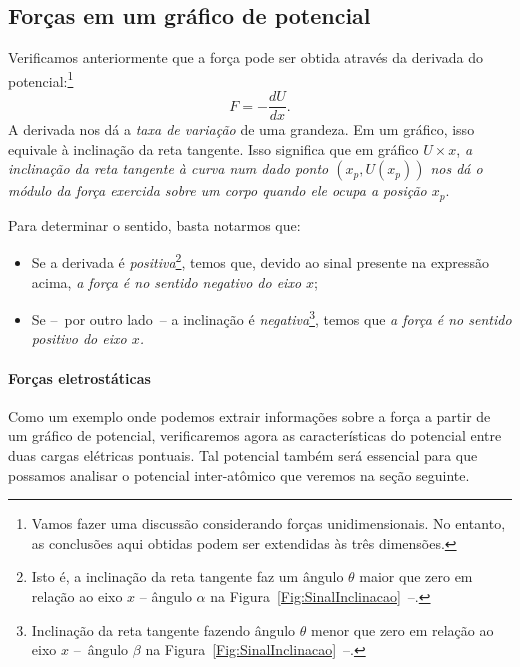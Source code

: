 \subsection{Forças em um gráfico de potencial}

Verificamos anteriormente que a força pode ser obtida através da derivada do potencial:\footnote{Vamos fazer uma discussão considerando forças unidimensionais. No entanto, as conclusões aqui obtidas podem ser extendidas às três dimensões.}
\begin{equation*}
    F = -\frac{dU}{dx}.
\end{equation*}
%
A derivada nos dá a \emph{taxa de variação} de uma grandeza. Em um gráfico, isso equivale à inclinação da reta tangente. Isso significa que em gráfico $U \times x$, \emph{a inclinação da reta tangente à curva num dado ponto $(x_p, U(x_p))$ nos dá o módulo da força exercida sobre um corpo quando ele ocupa a posição $x_p$}.

Para determinar o sentido, basta notarmos que:
\begin{itemize}
    \item Se a derivada é \emph{positiva}\footnote{Isto é, a inclinação da reta tangente faz um ângulo $\theta$ maior que zero em relação ao eixo $x$ -- ângulo $\alpha$ na Figura~\ref{Fig:SinalInclinacao}~--.}, temos que, devido ao sinal presente na expressão acima, \emph{a força é no sentido negativo do eixo $x$};
    \item Se --~por outro lado~-- a inclinação é \emph{negativa}\footnote{Inclinação da reta tangente fazendo ângulo $\theta$ menor que zero em relação ao eixo $x$ --~ângulo $\beta$ na Figura~\ref{Fig:SinalInclinacao}~--.}, temos que \emph{a força é no sentido positivo do eixo $x$.}
\end{itemize}

\paragraph{Forças eletrostáticas}

Como um exemplo onde podemos extrair informações sobre a força a partir de um gráfico de potencial, verificaremos agora as características do potencial entre duas cargas elétricas pontuais. Tal potencial também será essencial para que possamos analisar o potencial inter-atômico que veremos na seção seguinte.

